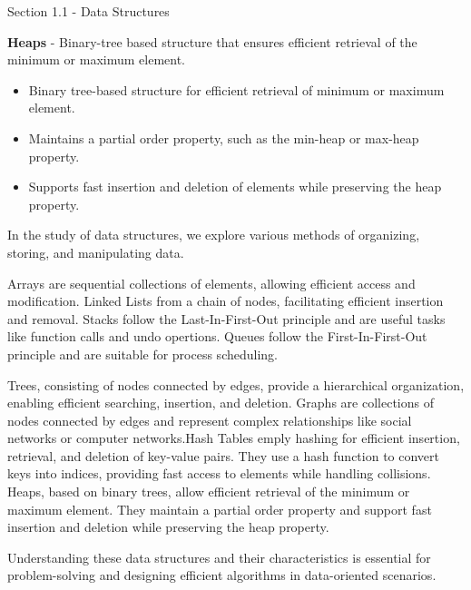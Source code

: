 \begin{notes}{Section 1.1 - Data Structures}
    \begin{highlight}[Heaps]
        \textbf{Heaps} - Binary-tree based structure that ensures efficient retrieval of the minimum or maximum element.
        \begin{itemize}
            \item Binary tree-based structure for efficient retrieval of minimum or maximum element.
            \item Maintains a partial order property, such as the min-heap or max-heap property.
            \item Supports fast insertion and deletion of elements while preserving the heap property.
        \end{itemize}
    \end{highlight}
    In the study of data structures, we explore various methods of organizing, storing, and manipulating data.
    
    Arrays are sequential collections of elements, allowing efficient access and modification. Linked Lists from a chain of nodes, facilitating
    efficient insertion and removal. Stacks follow the Last-In-First-Out principle and are useful tasks like function calls and undo opertions.
    Queues follow the First-In-First-Out principle and are suitable for process scheduling.
    
    Trees, consisting of nodes connected by edges, provide a hierarchical organization, enabling efficient searching, insertion, and deletion.
    Graphs are collections of nodes connected by edges and represent complex relationships like social networks or computer networks.Hash Tables emply hashing for efficient insertion, retrieval, and deletion of key-value pairs. 
    They use a hash function to convert keys into indices, providing fast access to elements while handling collisions. Heaps, based on binary trees, allow efficient retrieval of the minimum or maximum element. They maintain a 
    partial order property and support fast insertion and deletion while preserving the heap property.
    
    Understanding these data structures and their characteristics is essential for problem-solving and designing efficient algorithms in data-oriented
    scenarios.
\end{notes}

